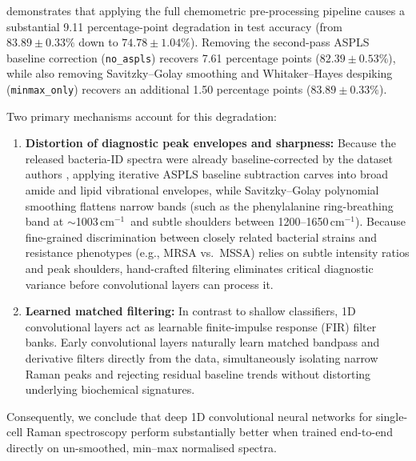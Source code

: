 \documentclass[journal,onecolumn]{IEEEtran}
\newcommand{\wn}{\,cm$^{-1}$}              %
\begin{document}
 demonstrates that applying the full chemometric
pre-processing pipeline causes a substantial 9.11 percentage-point degradation in
test accuracy (from $83.89 \pm 0.33\%$ down to $74.78 \pm 1.04\%$). Removing the
second-pass ASPLS baseline correction (\texttt{no\_aspls}) recovers 7.61 percentage
points ($82.39 \pm 0.53\%$), while also removing Savitzky--Golay smoothing and
Whitaker--Hayes despiking (\texttt{minmax\_only}) recovers an additional 1.50
percentage points ($83.89 \pm 0.33\%$).

Two primary mechanisms account for this degradation:
\begin{enumerate}
  \item \textbf{Distortion of diagnostic peak envelopes and sharpness:} Because the
        released bacteria-ID spectra were already baseline-corrected by the dataset
        authors \cite{ho2019rapid}, applying iterative ASPLS baseline subtraction
        carves into broad amide and lipid vibrational envelopes, while Savitzky--Golay
        polynomial smoothing flattens narrow bands (such as the phenylalanine
        ring-breathing band at $\sim$1003\wn\ and subtle shoulders between
        1200--1650\wn). Because fine-grained discrimination between closely related
        bacterial strains and resistance phenotypes (e.g., MRSA vs.\ MSSA) relies on
        subtle intensity ratios and peak shoulders, hand-crafted filtering eliminates
        critical diagnostic variance before convolutional layers can process it.
  \item \textbf{Learned matched filtering:} In contrast to shallow classifiers,
        1D convolutional layers act as learnable finite-impulse response (FIR)
        filter banks. Early convolutional layers naturally learn matched bandpass
        and derivative filters directly from the data, simultaneously isolating
        narrow Raman peaks and rejecting residual baseline trends without distorting
        underlying biochemical signatures.
\end{enumerate}
Consequently, we conclude that deep 1D convolutional neural networks for single-cell
Raman spectroscopy perform substantially better when trained end-to-end directly
on un-smoothed, min--max normalised spectra.
\end{document}

